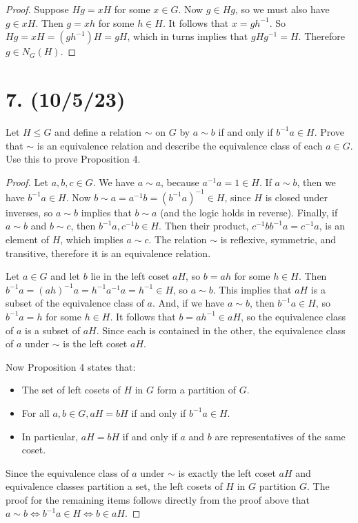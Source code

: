\documentclass{article}
\begin{document}
\begin{proof}
    Suppose $Hg = xH$ for some $x \in G$. Now $g \in Hg$, so we must also have $g \in xH$. Then $g = xh$ for some $h \in H$. It follows that $x = gh^{-1}$. So $Hg = xH = (gh^{-1})H = gH$, which in turns implies that $gHg^{-1} = H$. Therefore $g \in N_G(H)$.
\end{proof}

\section*{7. (10/5/23)}

Let $H \leq G$ and define a relation $\sim$ on $G$ by $a \sim b$ if and only if $b^{-1}a \in H$. Prove that $\sim$ is an equivalence relation and describe the equivalence class of each $a \in G$. Use this to prove Proposition 4.

\begin{proof}
    Let $a, b, c \in G$. We have $a \sim a$, because $a^{-1} a = 1 \in H$. If $a \sim b$, then we have $b^{-1}a \in H$. Now $b \sim a = a^{-1}b = (b^{-1}a)^{-1} \in H$, since $H$ is closed under inverses, so $a \sim b$ implies that $b \sim a$ (and the logic holds in reverse). Finally, if $a \sim b$ and $b \sim c$, then $b^{-1}a, c^{-1}b \in H$. Then their product, $c^{-1}bb^{-1}a = c^{-1}a$, is an element of $H$, which implies $a \sim c$. The relation $\sim$ is reflexive, symmetric, and transitive, therefore it is an equivalence relation.

    Let $a \in G$ and let $b$ lie in the left coset $aH$, so $b = ah$ for some $h \in H$. Then $b^{-1}a = (ah)^{-1}a = h^{-1}a^{-1}a = h^{-1} \in H$, so $a \sim b$. This implies that $aH$ is a subset of the equivalence class of $a$. And, if we have $a \sim b$, then $b^{-1}a \in H$, so $b^{-1}a = h$ for some $h \in H$. It follows that $b = ah^{-1} \in aH$, so the equivalence class of $a$ is a subset of $aH$. Since each is contained in the other, the equivalence class of $a$ under $\sim$ is the left coset $aH$.

    Now Proposition 4 states that:
    \begin{itemize}[itemsep=0em]
        \item The set of left cosets of $H$ in $G$ form a partition of $G$.
        \item For all $a, b \in G, aH = bH$ if and only if $b^{-1}a \in H$.
        \item In particular, $aH = bH$ if and only if $a$ and $b$ are representatives of the same coset.
    \end{itemize}
    Since the equivalence class of $a$ under $\sim$ is exactly the left coset $aH$ and equivalence classes partition a set, the left cosets of $H$ in $G$ partition $G$. The proof for the remaining items follows directly from the proof above that $a \sim b \iff b^{-1}a \in H \iff b \in aH$.
\end{proof}
\end{document}
